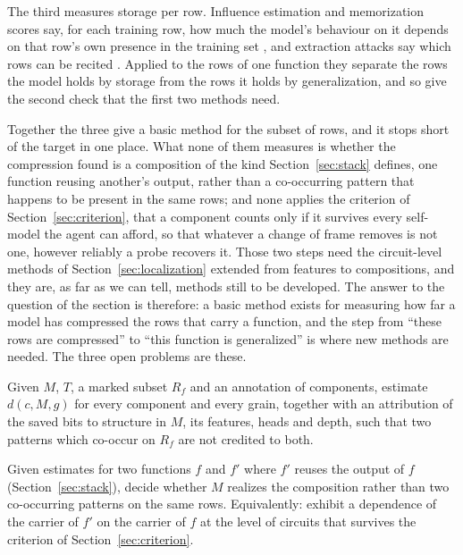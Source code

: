The third measures storage per row. Influence estimation and memorization scores say, for each
training row, how much the model's behaviour on it depends on that row's own presence in the training
set \citep{feldman2020}, and extraction attacks say which rows can be recited \citep{carlini2023}.
Applied to the rows of one function they separate the rows the model holds by storage from the rows it
holds by generalization, and so give the second check that the first two methods need.

Together the three give a basic method for the subset of rows, and it stops short of the target in one
place. What none of them measures is whether the compression found is a composition of the kind
Section~\ref{sec:stack} defines, one function reusing another's output, rather than a co-occurring
pattern that happens to be present in the same rows; and none applies the criterion of
Section~\ref{sec:criterion}, that a component counts only if it survives every self-model the agent can
afford, so that whatever a change of frame removes is not one, however reliably a probe recovers it.
Those two steps need the circuit-level methods of Section~\ref{sec:localization} extended from
features to compositions, and they are, as far as we can tell, methods still to be developed. The
answer to the question of the section is therefore: a basic method exists for measuring how far a
model has compressed the rows that carry a function, and the step from ``these rows are compressed''
to ``this function is generalized'' is where new methods are needed. The three open problems are these.

\begin{problem}
\label{prob:selective}
Given $M$, $T$, a marked subset $R_f$ and an annotation of components, estimate $d(c, M, g)$ for every
component and every grain, together with an attribution of the saved bits to structure in $M$, its
features, heads and depth, such that two patterns which co-occur on $R_f$ are not credited to both.
\end{problem}

\begin{problem}
\label{prob:composition}
Given estimates for two functions $f$ and $f'$ where $f'$ reuses the output of $f$
(Section~\ref{sec:stack}), decide whether $M$ realizes the composition rather than two co-occurring
patterns on the same rows. Equivalently: exhibit a dependence of the carrier of $f'$ on the carrier of
$f$ at the level of circuits that survives the criterion of Section~\ref{sec:criterion}.
\end{problem}

